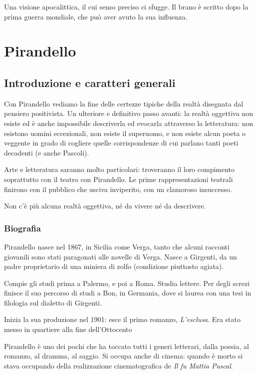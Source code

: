 Una visione apocalittica, il cui senso preciso ci sfugge. Il brano è scritto dopo la prima guerra mondiale, che può aver avuto la sua influenza.




\part{Pirandello}

\chapter{Introduzione e caratteri generali}


Con Pirandello vediamo la fine delle certezze tipiche della realtà disegnata dal pensiero positivista.
Un ulteriore e definitivo passo avanti: la realtà oggettiva non esiste ed è anche impossibile descriverla ed evocarla attraverso la letteratura: non esistono uomini eccezionali, non esiste il superuomo, e non esiste alcun poeta o veggente in grado di cogliere quelle corrispondenze di cui parlano tanti poeti decadenti (e anche Pascoli).

Arte e letteratura saranno molto particolari: troveranno il loro compimento soprattutto con il teatro con Pirandello. Le prime rappresentazioni teatrali finirono con il pubblico che usciva inviperito, con un clamoroso insuccesso.

Non c'è più alcuna realtà oggettiva, né da vivere né da descrivere.

\section{Biografia}

Pirandello nasce nel 1867, in Sicilia come Verga, tanto che alcuni racconti giovanili sono stati paragonati alle novelle di Verga.
Nasce a Girgenti, da un padre proprietario di una miniera di zolfo (condizione piuttosto agiata).

Compie gli studi prima a Palermo, e poi a Roma. Studia lettere.
Per degli screzi finisce il suo percorso di studi a Bon, in Germania, dove si laurea con una tesi in filologia sul dialetto di Girgenti.

Inizia la sua produzione nel 1901: esce il primo romanzo, \textit{L'esclusa}. Era stato messo in quartiere alla fine dell'Ottocento

Pirandello è uno dei pochi che ha toccato tutti i generi letterari, dalla poesia, al romanzo, al dramma, al saggio. Si occupa anche di cinema: quando è morto si stava occupando della realizzazione cinematografica de \textit{Il fu Mattia Pascal}.

